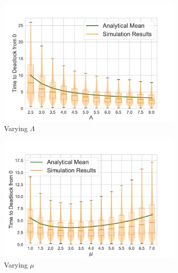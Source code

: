 \documentclass{article}
\numberwithin{equation}{section}
\begin{document}
\begin{figure}[!htbp]
  \begin{center}
  \begin{subfigure}[b]{0.48\textwidth}
    \includegraphics[width=\textwidth]{images/1Nms_varyL}
    \caption{Varying $\Lambda$}
    \label{fig:1Nms_L}
  \end{subfigure}
  \begin{subfigure}[b]{0.48\textwidth}
    \includegraphics[width=\textwidth]{images/1Nms_varymu}
    \caption{Varying $\mu$}
    \label{fig:1Nms_mu}
  \end{subfigure}\\
  \begin{subfigure}[b]{0.48\textwidth}

\end{subfigure}
\end{center}
\end{figure}
\end{document}
